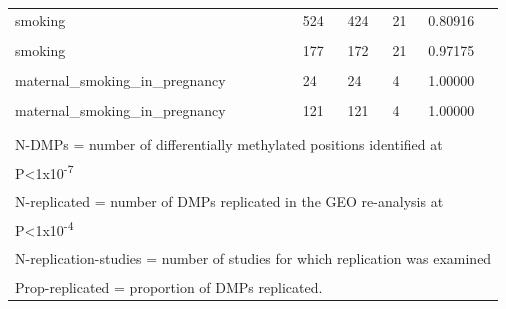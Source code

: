 \documentclass[11pt,twoside]{bristolthesis}
\begin{document}
\begin{table}
{\begin{tabular}[t]{lllll}
smoking & 524 & 424 & 21 & 0.80916\\
\cellcolor{gray!6}{smoking} & \cellcolor{gray!6}{192} & \cellcolor{gray!6}{0} & \cellcolor{gray!6}{21} & \cellcolor{gray!6}{0.00000}\\
smoking & 177 & 172 & 21 & 0.97175\\
\addlinespace
\cellcolor{gray!6}{maternal\_smoking\_in\_pregnancy} & \cellcolor{gray!6}{19} & \cellcolor{gray!6}{19} & \cellcolor{gray!6}{4} & \cellcolor{gray!6}{1.00000}\\
maternal\_smoking\_in\_pregnancy & 24 & 24 & 4 & 1.00000\\
\cellcolor{gray!6}{maternal\_smoking\_in\_pregnancy} & \cellcolor{gray!6}{1,591} & \cellcolor{gray!6}{413} & \cellcolor{gray!6}{4} & \cellcolor{gray!6}{0.25959}\\
maternal\_smoking\_in\_pregnancy & 121 & 121 & 4 & 1.00000\\
\cellcolor{gray!6}{maternal\_smoking\_in\_pregnancy} & \cellcolor{gray!6}{4} & \cellcolor{gray!6}{4} & \cellcolor{gray!6}{4} & \cellcolor{gray!6}{1.00000}\\
\bottomrule
\multicolumn{5}{l}{\textsuperscript{} N-DMPs = number of differentially methylated positions identified at}\\
\multicolumn{5}{l}{P<1x10\textsuperscript{-7}}\\
\multicolumn{5}{l}{\textsuperscript{} N-replicated = number of DMPs replicated in the GEO re-analysis at}\\
\multicolumn{5}{l}{P<1x10\textsuperscript{-4}}\\
\multicolumn{5}{l}{\textsuperscript{} N-replication-studies = number of studies for which replication was examined}\\
\multicolumn{5}{l}{\textsuperscript{} Prop-replicated = proportion of DMPs replicated.}\\
\end{tabular}}
\end{table}
\end{document}
